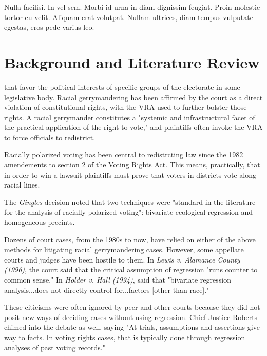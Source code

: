 \begin{savequote}[75mm]
Nulla facilisi. In vel sem. Morbi id urna in diam dignissim feugiat. Proin molestie tortor eu velit. Aliquam erat volutpat. Nullam ultrices, diam tempus vulputate egestas, eros pede varius leo.
\end{savequote}

\chapter{Background and Literature Review}


 that favor the political interests of specific groups of the electorate in some legislative body. Racial gerrymandering has been affirmed by the court as a direct violation of constitutional rights, with the VRA used to further bolster those rights. A racial gerrymander constitutes a "systemic and infrastructural facet of the practical application of the right to vote," and plaintiffs often invoke the VRA to force officials to redistrict.

Racially polarized voting has been central to redistrcting law since the 1982 amendements to section 2 of the Voting Rights Act.\cite{greiner} This means, practically, that in order to win a lawsuit plaintiffs must prove that voters in districts vote along racial lines.

The \textit{Gingles} decision noted that two techniques were "standard in the literature for the analysis of racially polarized voting"\cite{thornburg}: bivariate ecological regression and homogeneous precints.

Dozens of court cases, from the 1980s to now, have relied on either of the above methods for litigating racial gerrymandering cases\cite{greiner}. However, some appellate courts and judges have been hostile to them. In \textit{Lewis v. Alamance County (1996)}\cite{Lewis_Alamance}, the court said that the critical assumption of regression "runs counter to common sense." In \textit{Holder v. Hall (1994)}\cite{Holder_Hall}, said that "bivariate regression analysis...does not directly control for...factors [other than race]."

These citicisms were often ignored by peer and other courts because they did not posit new ways of deciding cases without using regression. Chief Justice Roberts chimed into the debate as well, saying "At trials, assumptions and assertions give way to facts. In voting rights cases, that is typically done through regression analyses of past voting records."\cite{LULAC}

